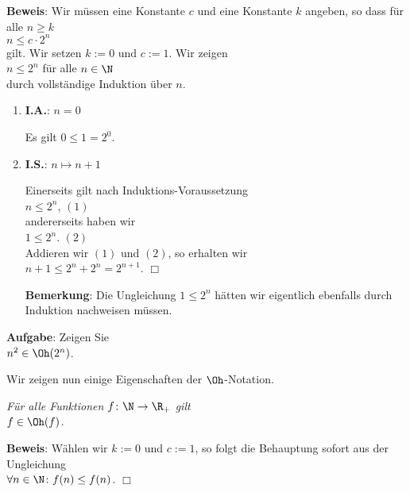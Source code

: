 \noindent
\textbf{Beweis}: Wir m\"ussen eine Konstante $c$ und eine Konstante $k$ angeben, so dass f\"ur
alle $n \geq k$
\\[0.1cm]
\hspace*{1.3cm} $ n \leq c \cdot 2^n$ \\[0.1cm]
gilt.  Wir setzen $k := 0$ und $c := 1$.  Wir zeigen \\[0.1cm]
\hspace*{1.3cm} $n \leq 2^n$ \quad f\"ur alle $n \in \N$ \\[0.1cm]
durch vollst\"andige Induktion \"uber $n$.
\begin{enumerate}
\item \textbf{I.A.}: $n = 0$

      Es gilt $0 \leq 1 = 2^0$.
\item \textbf{I.S.}: $n \mapsto n + 1$

      Einerseits gilt nach Induktions-Voraussetzung \\[0.1cm]
      \hspace*{1.3cm} $n \leq 2^n$, \hspace*{\fill} $(1)$ \\[0.1cm]
      andererseits haben wir \\[0.1cm]
      \hspace*{1.3cm} $1 \leq 2^n$. \hspace*{\fill} $(2)$ \\[0.1cm]
      Addieren wir $(1)$ und $(2)$, so erhalten wir \\[0.1cm]
      \hspace*{1.3cm} $n+1 \leq 2^n + 2^n = 2^{n+1}$. \hspace*{\fill} $\Box$

      \textbf{Bemerkung}: Die Ungleichung $1 \leq 2^n$ h\"atten wir eigentlich ebenfalls
      durch Induktion  nachweisen m\"ussen.
\end{enumerate}

\noindent
\textbf{Aufgabe}: Zeigen Sie \\[0.1cm]
\hspace*{1.3cm} $n^2 \in \Oh(2^n)$.
\vspace*{0.3cm}

\noindent
Wir zeigen nun einige Eigenschaften der $\Oh$-Notation.

\begin{Proposition}[Reflexivit\"at]
{\em
  F\"ur alle Funktionen $f\colon \N \rightarrow {\R_+}$ gilt \\[0.1cm]
  \hspace*{1.3cm} $f \in \Oh(f)$. 
}
\end{Proposition}
\textbf{Beweis}: W\"ahlen wir $k:=0$ und $c:=1$, so folgt die Behauptung sofort aus der
Ungleichung \\[0.1cm]
\hspace*{1.3cm} $\forall n \in \N\colon f(n) \leq f(n)$. \hspace*{\fill} $\Box$

